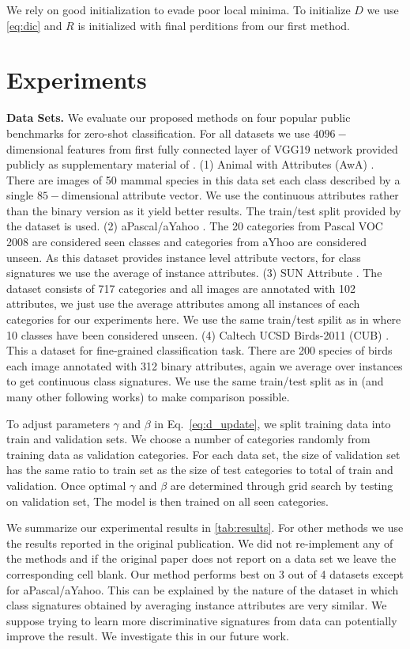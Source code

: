 \documentclass[wcp]{jmlr}
\begin{document}
We rely on good initialization to evade poor local minima.
To initialize $D$ we use
\eqref{eq:dic} and $R$ is initialized with final perditions from our first method.


\section{Experiments}
\textbf{Data Sets.}
We evaluate our proposed methods on four popular public benchmarks for zero-shot classification.
For all datasets we use $4096-$dimensional features from first fully connected layer of VGG19 network \cite{vgg}
provided publicly as supplementary material of \cite{sse}.
(1) Animal with Attributes (AwA) \cite{lampert09}. There are images of 50 mammal species in this data set
each class described by a single $85-$dimensional attribute vector. We use the continuous attributes rather than
the binary version as it yield better results. The train/test split provided by the dataset is used.
(2) aPascal/aYahoo \cite{farhadi09}. The 20 categories from Pascal VOC 2008 \cite{pascal} are considered seen classes and
categories from aYhoo are considered unseen. As this dataset provides instance level attribute vectors,
for class signatures we use the average of instance attributes.
(3) SUN Attribute \cite{sun}. The dataset consists of 717 categories and all images are annotated with 102 attributes, we just
use the average attributes among all instances of each categories for our experiments here. We use the same train/test spilit
as in \cite{jayaraman14} where 10 classes have been considered unseen.
(4) Caltech UCSD Birds-2011 (CUB) \cite{cub}. This a dataset for fine-grained classification task. There are 200 species of
birds each image annotated with 312 binary attributes, again we average over instances to get continuous class signatures.
We use the same train/test split as in \cite{akata13} (and many other following works) to make comparison possible.

To adjust parameters $\gamma$ and $\beta$ in Eq.~\ref{eq:d_update}, we split training data into train and validation sets.
We choose a number of categories randomly from training data as validation categories. For each data set, the size of
validation set has the same ratio to train set as the size of test categories to total of train and validation.
Once optimal $\gamma$ and $\beta$ are determined through grid search by testing on validation set, The model
is then trained on all seen categories.

We summarize our experimental results in \ref{tab:results}. For other methods we use the results reported in the original publication.
We did not re-implement any of the methods and if the original paper does not report on a data set we leave the corresponding cell blank.
Our method performs best on 3 out of 4 datasets except for aPascal/aYahoo. This can be explained by the nature of the dataset
in which class signatures obtained by averaging instance attributes are very similar. We suppose trying to learn
more discriminative signatures from data can potentially improve the result. We investigate this in our future work.
\end{document}
